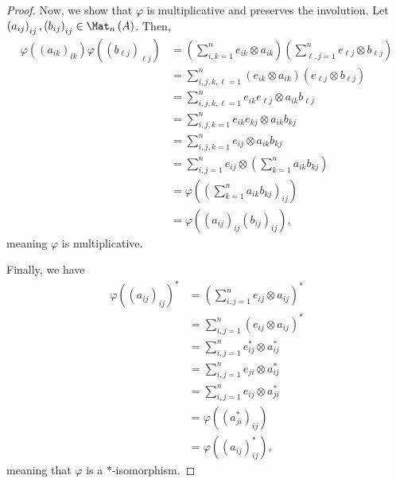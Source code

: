 \begin{proof}
  Now, we show that $\varphi$ is multiplicative and preserves the involution. Let $\left( a_{ij} \right)_{ij},\left( b_{ij} \right)_{ij}\in \Mat_n\left( A \right)$. Then,
  \begin{align*}
    \varphi\left( \left( a_{ik} \right)_{ik} \right)\varphi\left( \left( b_{\ell j} \right)_{\ell j} \right) &= \left( \sum_{i,k=1}^{n}e_{ik}\otimes a_{ik} \right)\left( \sum_{\ell,j=1}^{n}e_{\ell j}\otimes b_{\ell j} \right)\\
                                                                               &= \sum_{i,j,k,\ell=1}^{n}\left( e_{ik}\otimes a_{ik} \right)\left( e_{\ell j}\otimes b_{\ell j} \right)\\
                                                                               &= \sum_{i,j,k,\ell=1}^{n}e_{ik}e_{\ell j}\otimes a_{ik}b_{\ell j}\\
                                                                               &= \sum_{i,j,k=1}^{n}e_{ik}e_{kj}\otimes a_{ik}b_{kj}\\
                                                                               &= \sum_{i,j,k=1}^{n}e_{ij}\otimes a_{ik}b_{kj}\\
                                                                               &= \sum_{i,j=1}^{n}e_{ij}\otimes \left( \sum_{k=1}^{n}a_{ik}b_{kj} \right)\\
                                                                               &= \varphi\left( \left( \sum_{k=1}^{n}a_{ik}b_{kj} \right)_{ij} \right)\\
                                                                               &= \varphi\left( \left( a_{ij} \right)_{ij}\left( b_{ij} \right)_{ij} \right),
  \end{align*}
  meaning $\varphi$ is multiplicative.\newline

  Finally, we have
  \begin{align*}
    \varphi\left( \left( a_{ij} \right)_{ij} \right)^{\ast} &= \left( \sum_{i,j=1}^{n}e_{ij}\otimes a_{ij} \right)^{\ast}\\
                                                            &= \sum_{i,j=1}^{n}\left( e_{ij}\otimes a_{ij} \right)^{\ast}\\
                                                            &= \sum_{i,j=1}^{n}e_{ij}^{\ast}\otimes a_{ij}^{\ast}\\
                                                            &= \sum_{i,j=1}^{n}e_{ji}\otimes a_{ij}^{\ast}\\
                                                            &= \sum_{i,j=1}^{n}e_{ij}\otimes a_{ji}^{\ast}\\
                                                            &= \varphi\left( \left( a_{ji}^{\ast} \right)_{ij} \right)\\
                                                            &= \varphi\left( \left( a_{ij} \right)_{ij}^{\ast} \right),
  \end{align*}
  meaning that $\varphi$ is a $\ast$-isomorphism.
\end{proof}

